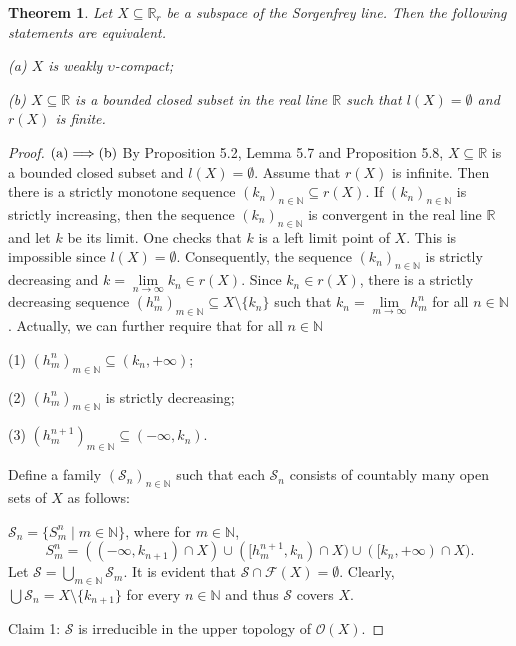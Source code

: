 \documentclass[preprint,12pt]{elsarticle}
\numberwithin{equation}{section}
\newtheorem{theorem}{Theorem}[section]
\begin{document}
\begin{theorem} Let $X\subseteq\mathbb{R}_{r}$ be a subspace of the Sorgenfrey line. Then the following statements are equivalent.

(a) $X$ is weakly $\upsilon$-compact;

(b) $X\subseteq\mathbb{R}$ is a bounded closed subset in the real line $\mathbb{R}$ such that $l(X)=\emptyset$ and $r(X)$ is finite.
\end{theorem}

\begin{proof}${\rm (a)\Longrightarrow(b)}$ By Proposition 5.2, Lemma 5.7 and Proposition 5.8, $X\subseteq\mathbb{R}$ is a bounded closed subset and $l(X)=\emptyset$. Assume that $r(X)$ is infinite. Then there is a strictly monotone sequence $(k_{n})_{n\in\mathbb{N}}\subseteq r(X)$. If $(k_{n})_{n\in\mathbb{N}}$ is strictly increasing, then the sequence $(k_{n})_{n\in\mathbb{N}}$ is convergent in the real line $\mathbb{R}$ and let $k$ be its limit. One checks that $k$ is a left limit point of $X$. This is impossible since $l(X)=\emptyset$. Consequently, the sequence $(k_{n})_{n\in\mathbb{N}}$ is strictly decreasing and $k=\lim\limits_{n\longrightarrow\infty}k_{n}\in r(X)$. Since $k_{n}\in r(X)$, there is a strictly decreasing sequence $(h^{n}_{m})_{m\in\mathbb{N}}\subseteq X\setminus\{k_{n}\}$ such that $k_{n}=\lim\limits_{m\longrightarrow\infty}h^{n}_{m}$ for all $n\in\mathbb{N}$. Actually, we can further require that for all $n\in\mathbb{N}$

(1) $(h^{n}_{m})_{m\in\mathbb{N}}\subseteq(k_{n},+\infty)$;

(2) $(h^{n}_{m})_{m\in\mathbb{N}}$ is strictly decreasing;

(3) $(h^{n+1}_{m})_{m\in\mathbb{N}}\subseteq(-\infty,k_{n})$.

Define a family $(\mathcal{S}_{n})_{ n\in\mathbb{N}}$ such that each $\mathcal{S}_{n}$ consists of countably many open sets of $X$ as follows:

$\mathcal{S}_{n}=\{S^{n}_{m}\mid m\in\mathbb{N}\}$, where for $m\in\mathbb{N}$,
\setlength{\baselineskip}{0.9\baselineskip}
$$S^{n}_{m}=((-\infty,k_{n+1})\cap X)\cup([h^{n+1}_{m},k_{n})\cap X)\cup([k_{n},+\infty)\cap X).$$
Let $\mathcal{S}=\bigcup\limits_{m\in\mathbb{N}}\mathcal{S}_{m}$. It is evident that $\mathcal{S}\cap\mathscr{F}(X)=\emptyset$. Clearly, $\bigcup\mathcal{S}_{n}=X\setminus\{k_{n+1}\}$ for every $n\in\mathbb{N}$ and thus $\mathcal{S}$ covers $X$.

Claim 1: $\mathcal{S}$ is irreducible in the upper topology of $\mathcal{O}(X)$.


\end{proof}
\end{document}
